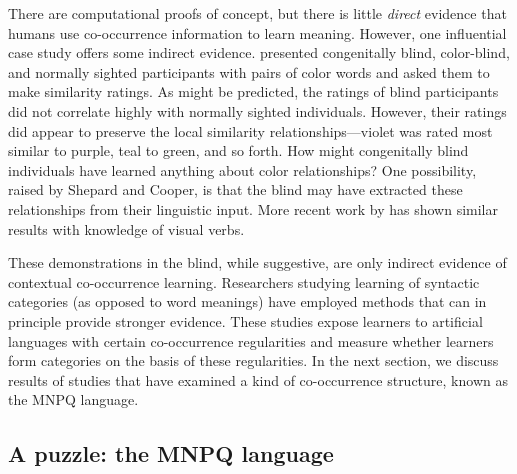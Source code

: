 \documentclass[man,floatsintext]{apa6}
\begin{document}
There are computational proofs of concept, but there is little \emph{direct} evidence that humans use co-occurrence information to learn meaning. However, one influential case study offers some indirect evidence. \citet{shepard1992} presented congenitally blind, color-blind, and normally sighted participants with pairs of color words and asked them to make similarity ratings. As might be predicted, the ratings of blind participants did not correlate highly with normally sighted individuals. However, their ratings did appear to preserve the local similarity relationships---violet was rated most similar to purple, teal to green, and so forth. How might congenitally blind individuals have learned anything about color relationships? One possibility, raised by Shepard and Cooper, is that the blind may have extracted these relationships from their linguistic input. More recent work by \citet{bedny2012} has shown similar results with knowledge of visual verbs.

These demonstrations in the blind, while suggestive, are only indirect evidence of contextual co-occurrence learning. Researchers studying learning of syntactic categories (as opposed to word meanings) have employed methods that can in principle provide stronger evidence. These studies expose learners to artificial languages with certain co-occurrence regularities and measure whether learners form categories on the basis of these regularities. In the next section, we discuss results of studies that have examined a kind of co-occurrence structure, known as the MNPQ language.

\subsection{A puzzle: the MNPQ language}
\end{document}
